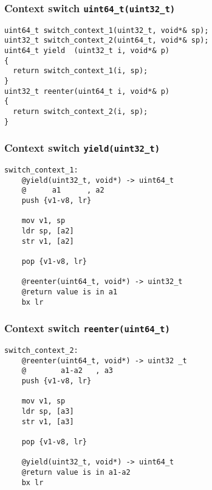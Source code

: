\documentclass{beamer}
\begin{document}
\begin{frame}[fragile]
\frametitle{Context switch \lstinline{uint64_t(uint32_t)}}
\begin{block}{}
\begin{lstlisting}[basicstyle=\small]
uint64_t switch_context_1(uint32_t, void*& sp);
uint32_t switch_context_2(uint64_t, void*& sp);
uint64_t yield  (uint32_t i, void*& p)
{
  return switch_context_1(i, sp);
}
uint32_t reenter(uint64_t i, void*& p)
{
  return switch_context_2(i, sp);
}

\end{lstlisting}
\end{block}
\end{frame}

\begin{frame}[fragile]
\frametitle{Context switch \lstinline{yield(uint32_t)}}
\begin{block}{}
\begin{lstlisting}[language=ASM, basicstyle=\small]
switch_context_1:
    @yield(uint32_t, void*) -> uint64_t
    @      a1      , a2
    push {v1-v8, lr}

    mov v1, sp
    ldr sp, [a2]
    str v1, [a2]

    pop {v1-v8, lr}

    @reenter(uint64_t, void*) -> uint32_t
    @return value is in a1
    bx lr
\end{lstlisting}
\end{block}
\end{frame}

\begin{frame}[fragile]
\frametitle{Context switch \lstinline{reenter(uint64_t)}}
\begin{block}{}
\begin{lstlisting}[language=ASM, basicstyle=\small]
switch_context_2:
    @reenter(uint64_t, void*) -> uint32	_t
    @        a1-a2   , a3
    push {v1-v8, lr}

    mov v1, sp
    ldr sp, [a3]
    str v1, [a3]

    pop {v1-v8, lr}

    @yield(uint32_t, void*) -> uint64_t
    @return value is in a1-a2
    bx lr
\end{lstlisting}
\end{block}
\end{frame}
\end{document}
